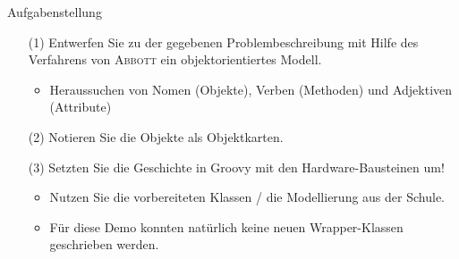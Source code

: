 \documentclass[usenames,dvipsnames]{beamer}
\begin{document}

\begin{frame}{Aufgabenstellung}
	\begin{itemize}
		\item[(1)] Entwerfen Sie zu der gegebenen Problembeschreibung mit Hilfe des Verfahrens von \textsc{Abbott} ein objektorientiertes Modell.
		\begin{itemize}
			\item Heraussuchen von Nomen (Objekte), Verben (Methoden) und Adjektiven (Attribute)
		\end{itemize}

		\item[(2)] Notieren Sie die Objekte als Objektkarten.

		\item[(3)] Setzten Sie die Geschichte in Groovy mit den Hardware-Bausteinen um!
		\begin{itemize}
			\item Nutzen Sie die vorbereiteten Klassen / die Modellierung aus der Schule.
			\item Für diese Demo konnten natürlich keine neuen Wrapper-Klassen geschrieben werden.
		\end{itemize}
	\end{itemize}
\end{frame}



\end{document}
